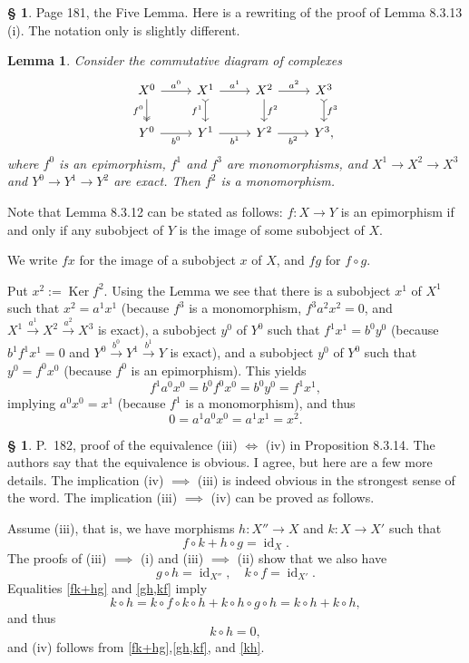 \documentclass[12pt]{article}
\newtheorem{lem}[thm]{Lemma}
\theoremstyle{remark}
\theoremstyle{definition}
\newtheorem{cm}[thm]{\S}
\newcommand{\bc}{\begin{cm}}\newcommand{\ec}{\end{cm}}
\newcommand{\n}{\noindent}
\newcommand{\pf}{\n{\em Proof. }}
\newcommand{\be}{\begin{equation}}
\newcommand{\ee}{\end{equation}}
\newcommand{\bl}{\begin{lem}}
\newcommand{\el}{\end{lem}}
\DeclareMathOperator{\id}{id}
\DeclareMathOperator{\Ker}{Ker}
\begin{document}
\bc Page 181, the Five Lemma. Here is a rewriting of the proof of Lemma 8.3.13 (i). The notation only is slightly different. 
%
\bl 
Consider the commutative diagram of complexes 
$$
\begin{tikzcd}
X^0\arrow[two heads]{d}[swap]{f^0}\arrow{r}{a^0}&
X^1\arrow[tail]{d}[swap]{f^1}\arrow{r}{a^1}&
X^2\arrow{d}{f^2}\arrow{r}{a^2}&
X^3\arrow[tail]{d}{f^3}\\ 
Y^0\arrow{r}[swap]{b^0}&
Y^1\arrow{r}[swap]{b^1}&
Y^2\arrow{r}[swap]{b^2}&
Y^3,
\end{tikzcd}
$$
where $f^0$ is an epimorphism, $f^1$ and $f^3$ are monomorphisms, and $X^1\to X^2\to X^3$ and $Y^0\to Y^1\to Y^2$ are exact. Then $f^2$ is a monomorphism. 
\el 
% 
\pf Note that Lemma 8.3.12 can be stated as follows: $f:X\to Y$ is an epimorphism if and only if any subobject of $Y$ is the image of some subobject of $X$. 

We write $fx$ for the image of a subobject $x$ of $X$, and $fg$ for $f\circ g$.

Put $x^2:=\Ker f^2$. Using the Lemma we see that there is a subobject $x^1$ of $X^1$ such that $x^2=a^1x^1$ (because $f^3$ is a monomorphism, $f^3a^2x^2=0$, and $X^1\overset{a^1}{\to}X^2\overset{a^2}{\to}X^3$ is exact), a subobject $y^0$ of $Y^0$ such that $f^1x^1=b^0y^0$ (because $b^1f^1x^1=0$ and $Y^0\overset{b^0}{\to}Y^1\overset{b^1}{\to}Y$ is exact), and a subobject $y^0$ of $Y^0$ such that $y^0=f^0x^0$ (because $f^0$ is an epimorphism). This yields  
$$
f^1a^0x^0=b^0f^0x^0=b^0y^0=f^1x^1,
$$
implying $a^0x^0=x^1$ (because $f^1$ is a monomorphism), and thus 
$$
0=a^1a^0x^0=a^1x^1=x^2.
$$
\ec 


\bc P.~182, proof of the equivalence (iii) $\iff$ (iv) in Proposition 8.3.14. The authors say that the equivalence is obvious. I agree, but here are a few more details. The implication (iv) $\implies$ (iii) is indeed obvious in the strongest sense of the word. The implication (iii) $\implies$ (iv) can be proved as follows. 

Assume (iii), that is, we have morphisms $h:X''\to X$ and $k:X\to X'$ such that 
\be\label{fk+hg} 
f\circ k+h\circ g=\id_X.
\ee 
The proofs of (iii) $\implies$ (i) and (iii) $\implies$ (ii) show that we also have 
\be\label{gh,kf} 
g\circ h=\id_{X''},\quad k\circ f=\id_{X'}.
\ee 
Equalities \eqref{fk+hg} and \eqref{gh,kf} imply 
$$
k\circ h=k\circ f\circ k\circ h+k\circ h\circ g\circ h=k\circ h+k\circ h,
$$ 
and thus 
\be\label{kh} 
k\circ h=0, 
\ee 
and (iv) follows from  \eqref{fk+hg},\eqref{gh,kf}, and \eqref{kh}.
\ec 
\end{document}
